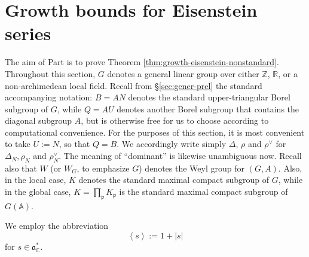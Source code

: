 \documentclass[reqno]{amsart}
\theoremstyle{plain} \newtheorem{theorem} {Theorem}
\theoremstyle{definition} \newtheorem{definition} [theorem] {Definition}
\theoremstyle{itplain} %
\numberwithin{equation}{section}
\numberwithin{theorem}{section}
\begin{document}
\part{Growth bounds for Eisenstein series}\label{part:local-l2-growth}
The aim of Part \ref{part:local-l2-growth} is to prove Theorem \ref{thm:growth-eisenstein-nonstandard}.  Throughout this section, $G$ denotes a general linear group over either $\mathbb{Z}$, $\mathbb{R}$, or a non-archimedean local field.  Recall from \S\ref{sec:gener-prel} the standard accompanying notation: $B = A N$ denotes the standard upper-triangular Borel subgroup of $G$, while $Q = A U$ denotes another Borel subgroup that contains the diagonal subgroup $A$, but is otherwise free for us to choose according to computational convenience.  For the purposes of this section, it is most convenient to take $U := N$, so that $Q = B$.  We accordingly write simply $\Delta$, $\rho$ and $\rho^\vee$ for $\Delta_N, \rho_N$ and $\rho_N^\vee$.  The meaning of ``dominant'' is likewise unambiguous now.  Recall also that $W$ (or $W_G$, to emphasize $G$) denotes the Weyl group for $(G,A)$.  Also, in the local case, $K$ denotes the standard maximal compact subgroup of $G$, while in the global case, $K = \prod_\mathfrak{p} K_\mathfrak{p}$ is the standard maximal compact subgroup of $G(\mathbb{A})$.

We employ the abbreviation
\begin{equation*}
  \left\langle s \right\rangle := 1 + |s|
\end{equation*}
for $s \in \mathfrak{a}_{\mathbb{C}}^*$.
\end{document}
